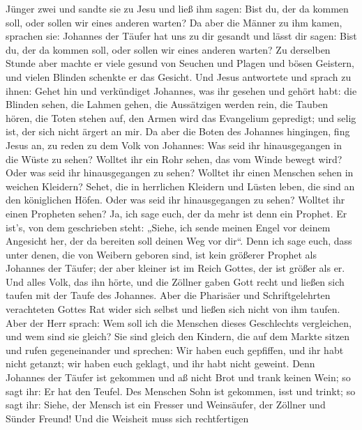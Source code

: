 Jünger zwei  und sandte sie zu Jesu und ließ ihm sagen:
Bist du, der da kommen soll, oder sollen wir eines anderen warten?
 Da aber die Männer zu ihm kamen, sprachen sie: Johannes
der Täufer hat uns zu dir gesandt und lässt dir sagen: Bist du, der da
kommen soll, oder sollen wir eines anderen warten?  Zu
derselben Stunde aber machte er viele gesund von Seuchen und Plagen und
bösen Geistern, und vielen Blinden schenkte er das Gesicht.
 Und Jesus antwortete und sprach zu ihnen: Gehet hin und
verkündiget Johannes, was ihr gesehen und gehört habt: die Blinden
sehen, die Lahmen gehen, die Aussätzigen werden rein, die Tauben hören,
die Toten stehen auf, den Armen wird das Evangelium gepredigt;
 und selig ist, der sich nicht ärgert an mir. 
Da aber die Boten des Johannes hingingen, fing Jesus an, zu reden zu dem
Volk von Johannes: Was seid ihr hinausgegangen in die Wüste zu sehen?
Wolltet ihr ein Rohr sehen, das vom Winde bewegt wird? 
Oder was seid ihr hinausgegangen zu sehen? Wolltet ihr einen Menschen
sehen in weichen Kleidern? Sehet, die in herrlichen Kleidern und Lüsten
leben, die sind an den königlichen Höfen.  Oder was seid
ihr hinausgegangen zu sehen? Wolltet ihr einen Propheten sehen? Ja, ich
sage euch, der da mehr ist denn ein Prophet.  Er ist's, von
dem geschrieben steht: „Siehe, ich sende meinen Engel vor deinem
Angesicht her, der da bereiten soll deinen Weg vor dir``. 
Denn ich sage euch, dass unter denen, die von Weibern geboren sind, ist
kein größerer Prophet als Johannes der Täufer; der aber kleiner ist im
Reich Gottes, der ist größer als er.  Und alles Volk, das
ihn hörte, und die Zöllner gaben Gott recht und ließen sich taufen mit
der Taufe des Johannes.  Aber die Pharisäer und
Schriftgelehrten verachteten Gottes Rat wider sich selbst und ließen
sich nicht von ihm taufen.  Aber der Herr sprach: Wem soll
ich die Menschen dieses Geschlechts vergleichen, und wem sind sie
gleich?  Sie sind gleich den Kindern, die auf dem Markte
sitzen und rufen gegeneinander und sprechen: Wir haben euch gepfiffen,
und ihr habt nicht getanzt; wir haben euch geklagt, und ihr habt nicht
geweint.  Denn Johannes der Täufer ist gekommen und aß
nicht Brot und trank keinen Wein; so sagt ihr: Er hat den Teufel.
 Des Menschen Sohn ist gekommen, isst und trinkt; so sagt
ihr: Siehe, der Mensch ist ein Fresser und Weinsäufer, der Zöllner und
Sünder Freund!  Und die Weisheit muss sich rechtfertigen
